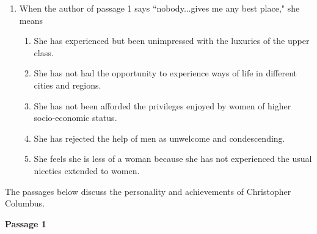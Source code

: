 \begin{enumerate}
\bigskip
\item When the author of passage 1 says ``nobody...gives me any best place," she means
\begin{enumerate}[label=(\Alph*)]
\item She has experienced but been unimpressed with the luxuries of the upper class.
\item She has not had the opportunity to experience ways of life in different cities and regions.
\item She has not been afforded the privileges enjoyed by women of higher socio-economic status.
\item She has rejected the help of men as unwelcome and condescending.
\item She feels she is less of a woman because she has not experienced the usual niceties extended to women.
\end{enumerate}

\end{enumerate}

\bigskip
The passages below discuss the personality and achievements of Christopher Columbus.

\bigskip
\textbf{Passage 1}

